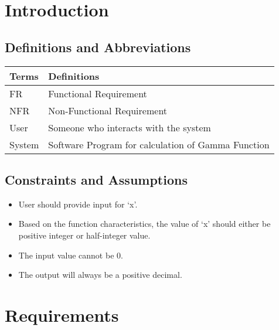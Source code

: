 \section{Introduction}
    \subsection{Definitions and Abbreviations}
    \begin{center}
    \begin{tabular}{ |p{3cm} | p{10cm}| }
        \hline
        \textbf{Terms} & \textbf{Definitions} \\
        \hline
        FR & Functional Requirement \\
        \hline
        NFR & Non-Functional Requirement \\
        \hline
        User & Someone who interacts with the system \\
        \hline
        System & Software Program for calculation of Gamma Function \\
        \hline
    \end{tabular}
    \end{center}

    \subsection{Constraints and Assumptions}
    \begin{itemize}
        \item User should provide input for ‘x’.
        \item Based on the function characteristics, the value of ‘x’ should either be positive integer or half-integer value.
        \item The input value cannot be 0.
        \item The output will always be a positive decimal.
    \end{itemize}

    \section{Requirements}
